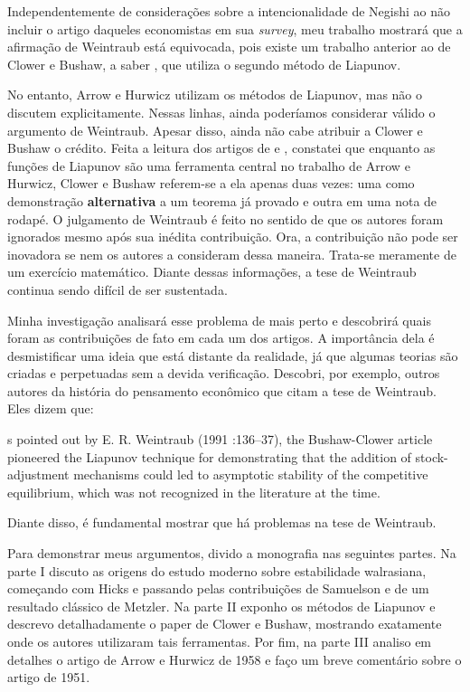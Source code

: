 \documentclass[
	12pt,				%
	openright,			%
	twoside,			%
	a4paper,			%
	english,			%
	french,				%
	spanish,			%
	brazil				%
	]{abntex2}
\begin{document}
Independentemente de considerações sobre a intencionalidade de Negishi ao não
incluir o artigo daqueles economistas em sua \textit{survey}, meu trabalho
mostrará que a afirmação de Weintraub está equivocada, pois existe um trabalho
anterior ao de Clower e Bushaw, a saber , que
utiliza o segundo método de Liapunov.

No entanto, Arrow e Hurwicz utilizam os métodos de Liapunov, mas não o
discutem explicitamente. Nessas linhas, ainda poderíamos considerar válido o argumento
de Weintraub. Apesar disso, ainda não cabe atribuir a Clower e Bushaw o
crédito. Feita a leitura dos artigos de
 e , constatei que
enquanto as funções de Liapunov são uma ferramenta central no trabalho de
Arrow e Hurwicz, Clower e Bushaw referem-se a ela apenas duas vezes: uma como
demonstração \textbf{alternativa} a um teorema já provado e outra em uma nota
de rodapé. O julgamento de Weintraub é feito no sentido de que os autores
foram ignorados mesmo após sua inédita contribuição. Ora, a contribuição não
pode ser inovadora se nem os autores a consideram dessa maneira. Trata-se
meramente de um exercício matemático. Diante dessas informações, a tese de Weintraub
continua sendo difícil de ser sustentada.

Minha investigação analisará esse problema de mais perto e descobrirá
quais foram as contribuições de fato em cada um dos artigos. A importância dela
é desmistificar uma ideia que está distante da realidade, já que
algumas teorias são criadas e perpetuadas sem a devida verificação. Descobri,
por exemplo, outros autores da história do pensamento econômico que citam a
tese de Weintraub. Eles dizem que:

\begin{citacao}[english]
[a]s pointed out by E. R. Weintraub (1991 :136–37),
the Bushaw-Clower article pioneered the Liapunov technique for demonstrating
that the addition of stock-adjustment mechanisms could led to asymptotic
stability of the competitive equilibrium, which was not recognized in the
literature at the time.
\cite[p. 47]{backhouseboianovsky2013}
\end{citacao}

Diante disso, é fundamental mostrar que há problemas na tese de Weintraub.

Para demonstrar meus argumentos, divido a monografia nas seguintes partes.
Na parte I discuto as origens do estudo moderno sobre estabilidade
walrasiana, começando com Hicks e passando pelas contribuições de Samuelson e
de um resultado clássico de Metzler.
Na parte II exponho os métodos de Liapunov e descrevo detalhadamente o paper de
Clower e Bushaw, mostrando exatamente onde os autores utilizaram tais
ferramentas.
Por fim, na parte III analiso em detalhes o artigo de Arrow e Hurwicz de 1958 e
faço um breve comentário sobre o artigo de 1951.
\end{document}

